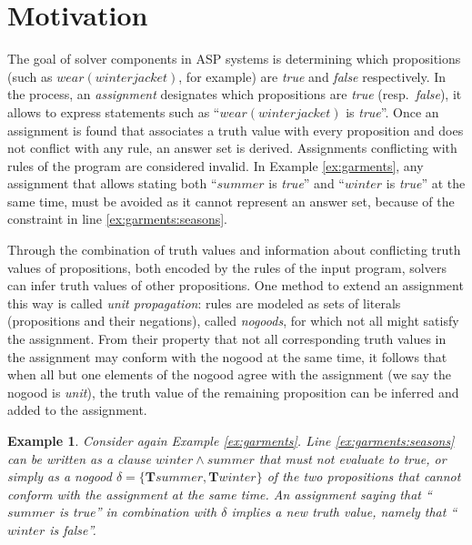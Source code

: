 \documentclass{vutinfth} %
\newtheorem{example}{Example}[section]
\newcommand{\bT}{\mathbf{T}}
\begin{document}
\section{Motivation}
\label{sec:motivation}

The goal of solver components in ASP systems is determining which propositions (such as $wear(winterjacket)$, for example) are \emph{true} and \emph{false} respectively. In the process, an \emph{assignment} designates which propositions are \emph{true} (resp.~\emph{false}), it allows to express statements such as \enquote{$wear(winterjacket)$ is \emph{true}}. Once an assignment is found that associates a truth value with every proposition and does not conflict with any rule, an answer set is derived. Assignments conflicting with rules of the program are considered invalid. In Example \ref{ex:garments}, any assignment that allows stating both \enquote{$summer$ is \emph{true}} and \enquote{$winter$ is \emph{true}} at the same time, must be avoided as it cannot represent an answer set, because of the constraint in line \ref{ex:garments:seasons}.

Through the combination of truth values and information about conflicting truth values of propositions, both encoded by the rules of the input program, solvers can infer truth values of other propositions. One method to extend an assignment this way is called \emph{unit propagation}: rules are modeled as sets of literals (propositions and their negations), called \emph{nogoods}, for which not all might satisfy the assignment. From their property that not all corresponding truth values in the assignment may conform with the nogood at the same time, it follows that when all but one elements of the nogood agree with the assignment (we say the nogood is \emph{unit}), the truth value of the remaining proposition can be inferred and added to the assignment.

\begin{example}
\label{ex:garmentprop}
Consider again Example \ref{ex:garments}. Line \ref{ex:garments:seasons} can be written as a clause $winter \wedge summer$ that must not evaluate to \emph{true}, or simply as a nogood $\delta = \{ \bT summer, \bT winter \}$ of the two propositions that cannot conform with the assignment at the same time. An assignment saying that \enquote{$summer$ is \emph{true}} in combination with $\delta$ implies a new truth value, namely that \enquote{$winter$ is \emph{false}}.
\end{example}
\end{document}
